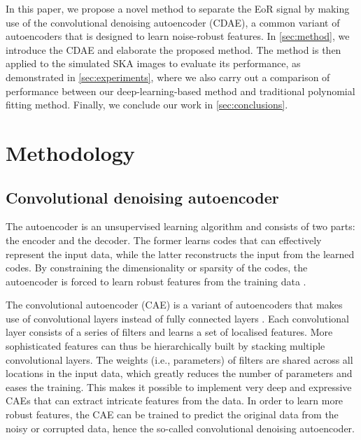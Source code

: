 \documentclass[letters,a4paper,fleqn,usenatbib]{mnras}
\begin{document}
In this paper, we propose a novel method to separate the EoR signal by
making use of the convolutional denoising autoencoder (CDAE), a common
variant of autoencoders that is designed to learn noise-robust features.
In \autoref{sec:method}, we introduce the CDAE and elaborate the
proposed method.
The method is then applied to the simulated SKA images to evaluate its
performance, as demonstrated in \autoref{sec:experiments},
where we also carry out a comparison of performance between our
deep-learning-based method and traditional polynomial fitting method.
Finally, we conclude our work in \autoref{sec:conclusions}.


\section{Methodology}
\label{sec:method}

\subsection{Convolutional denoising autoencoder}
\label{sec:cdae}

The autoencoder is an unsupervised learning algorithm and consists of
two parts: the encoder and the decoder.
The former learns codes that can effectively represent the input data,
while the latter reconstructs the input from the learned codes.
By constraining the dimensionality or sparsity of the codes, the
autoencoder is forced to learn robust features from the training data
\citep[chapter 14]{goodfellow2016}.

The convolutional autoencoder (CAE) is a variant of autoencoders that
makes use of convolutional layers instead of fully connected layers
\citep{masci2011}.
Each convolutional layer consists of a series of filters and learns
a set of localised features.
More sophisticated features can thus be hierarchically built by stacking
multiple convolutional layers.
The weights (i.e., parameters) of filters are shared across all
locations in the input data, which greatly reduces the number of
parameters and eases the training.
This makes it possible to implement very deep and expressive CAEs that
can extract intricate features from the data.
In order to learn more robust features, the CAE can be trained to
predict the original data from the noisy or corrupted data, hence the
so-called convolutional denoising autoencoder.
\end{document}
